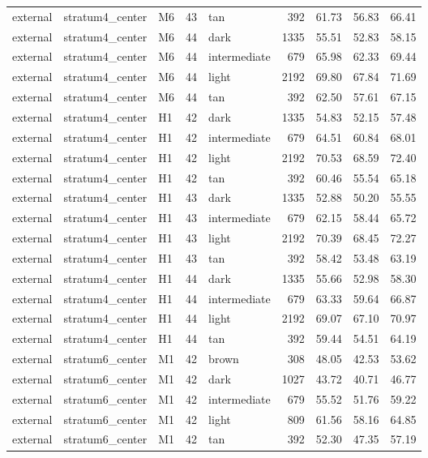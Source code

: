 \begin{tabular}{lllrlrrrr}
external & stratum4\_center & M6 & 43 & tan & 392 & 61.73 & 56.83 & 66.41 \\
external & stratum4\_center & M6 & 44 & dark & 1335 & 55.51 & 52.83 & 58.15 \\
external & stratum4\_center & M6 & 44 & intermediate & 679 & 65.98 & 62.33 & 69.44 \\
external & stratum4\_center & M6 & 44 & light & 2192 & 69.80 & 67.84 & 71.69 \\
external & stratum4\_center & M6 & 44 & tan & 392 & 62.50 & 57.61 & 67.15 \\
external & stratum4\_center & H1 & 42 & dark & 1335 & 54.83 & 52.15 & 57.48 \\
external & stratum4\_center & H1 & 42 & intermediate & 679 & 64.51 & 60.84 & 68.01 \\
external & stratum4\_center & H1 & 42 & light & 2192 & 70.53 & 68.59 & 72.40 \\
external & stratum4\_center & H1 & 42 & tan & 392 & 60.46 & 55.54 & 65.18 \\
external & stratum4\_center & H1 & 43 & dark & 1335 & 52.88 & 50.20 & 55.55 \\
external & stratum4\_center & H1 & 43 & intermediate & 679 & 62.15 & 58.44 & 65.72 \\
external & stratum4\_center & H1 & 43 & light & 2192 & 70.39 & 68.45 & 72.27 \\
external & stratum4\_center & H1 & 43 & tan & 392 & 58.42 & 53.48 & 63.19 \\
external & stratum4\_center & H1 & 44 & dark & 1335 & 55.66 & 52.98 & 58.30 \\
external & stratum4\_center & H1 & 44 & intermediate & 679 & 63.33 & 59.64 & 66.87 \\
external & stratum4\_center & H1 & 44 & light & 2192 & 69.07 & 67.10 & 70.97 \\
external & stratum4\_center & H1 & 44 & tan & 392 & 59.44 & 54.51 & 64.19 \\
external & stratum6\_center & M1 & 42 & brown & 308 & 48.05 & 42.53 & 53.62 \\
external & stratum6\_center & M1 & 42 & dark & 1027 & 43.72 & 40.71 & 46.77 \\
external & stratum6\_center & M1 & 42 & intermediate & 679 & 55.52 & 51.76 & 59.22 \\
external & stratum6\_center & M1 & 42 & light & 809 & 61.56 & 58.16 & 64.85 \\
external & stratum6\_center & M1 & 42 & tan & 392 & 52.30 & 47.35 & 57.19 \\

\end{tabular}
